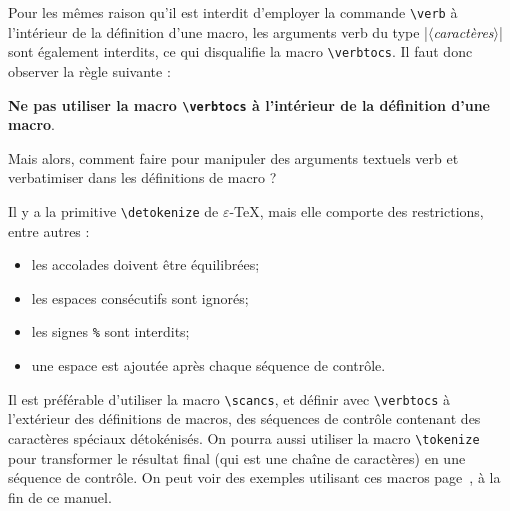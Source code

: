 \documentclass[a4paper,10pt,french]{article}
\newcommand\guill[1]{\og{}#1\fg{}}
\newcommand\argu[1]{$\langle$\textit{#1}$\rangle$}
\newcommand\verbinline{\lstinline[basicstyle=\normalsize\ttfamily]}
\begin{document}
Pour les mêmes raison qu'il est interdit d'employer la commande \verb|\verb| à l'intérieur de la définition d'une macro, les arguments  verb du type |\argu{caractères}| sont également interdits, ce qui disqualifie la macro \verbinline|\verbtocs|. Il faut donc observer la règle suivante :\par\medskip
\hfill{\bfseries Ne pas utiliser la macro \verbinline-\verbtocs- à l'intérieur de la définition d'une macro}.\hfill{}\bigskip

Mais alors, comment faire pour manipuler des arguments textuels verb et \guill{verbatimiser} dans les définitions de macro ?\bigskip

Il y a la primitive \verb|\detokenize| de $\varepsilon$-\TeX, mais elle comporte des restrictions, entre autres :

\nobreak
\begin{itemize}
	\item les accolades doivent être équilibrées;
	\item les espaces consécutifs sont ignorés;
	\item les signes \verb|%| sont interdits;
	\item une espace est ajoutée après chaque séquence de contrôle.
\end{itemize}
\medskip

Il est préférable d'utiliser la macro \verbinline|\scancs|, et définir avec \verbinline|\verbtocs| à l'extérieur des définitions de macros, des séquences de contrôle contenant des caractères spéciaux détokénisés. On pourra aussi utiliser la macro \verbinline|\tokenize| pour transformer le résultat final (qui est une chaîne de caractères) en une séquence de contrôle. On peut voir des exemples utilisant ces macros page~\pageref{exemples}, à la fin de ce manuel.\medskip
\end{document}
